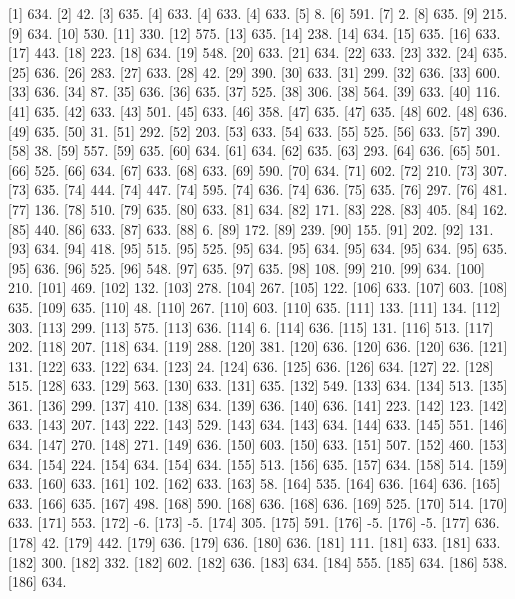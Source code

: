 [1] 634.
[2]  42.
[3] 635.
[4] 633.
[4] 633.
[4] 633.
[5]   8.
[6] 591.
[7]   2.
[8] 635.
[9] 215.
[9] 634.
[10] 530.
[11] 330.
[12] 575.
[13] 635.
[14] 238.
[14] 634.
[15] 635.
[16] 633.
[17] 443.
[18] 223.
[18] 634.
[19] 548.
[20] 633.
[21] 634.
[22] 633.
[23] 332.
[24] 635.
[25] 636.
[26] 283.
[27] 633.
[28]  42.
[29] 390.
[30] 633.
[31] 299.
[32] 636.
[33] 600.
[33] 636.
[34]  87.
[35] 636.
[36] 635.
[37] 525.
[38] 306.
[38] 564.
[39] 633.
[40] 116.
[41] 635.
[42] 633.
[43] 501.
[45] 633.
[46] 358.
[47] 635.
[47] 635.
[48] 602.
[48] 636.
[49] 635.
[50]  31.
[51] 292.
[52] 203.
[53] 633.
[54] 633.
[55] 525.
[56] 633.
[57] 390.
[58]  38.
[59] 557.
[59] 635.
[60] 634.
[61] 634.
[62] 635.
[63] 293.
[64] 636.
[65] 501.
[66] 525.
[66] 634.
[67] 633.
[68] 633.
[69] 590.
[70] 634.
[71] 602.
[72] 210.
[73] 307.
[73] 635.
[74] 444.
[74] 447.
[74] 595.
[74] 636.
[74] 636.
[75] 635.
[76] 297.
[76] 481.
[77] 136.
[78] 510.
[79] 635.
[80] 633.
[81] 634.
[82] 171.
[83] 228.
[83] 405.
[84] 162.
[85] 440.
[86] 633.
[87] 633.
[88]   6.
[89] 172.
[89] 239.
[90] 155.
[91] 202.
[92] 131.
[93] 634.
[94] 418.
[95] 515.
[95] 525.
[95] 634.
[95] 634.
[95] 634.
[95] 634.
[95] 635.
[95] 636.
[96] 525.
[96] 548.
[97] 635.
[97] 635.
[98] 108.
[99] 210.
[99] 634.
[100] 210.
[101] 469.
[102] 132.
[103] 278.
[104] 267.
[105] 122.
[106] 633.
[107] 603.
[108] 635.
[109] 635.
[110]  48.
[110] 267.
[110] 603.
[110] 635.
[111] 133.
[111] 134.
[112] 303.
[113] 299.
[113] 575.
[113] 636.
[114]   6.
[114] 636.
[115] 131.
[116] 513.
[117] 202.
[118] 207.
[118] 634.
[119] 288.
[120] 381.
[120] 636.
[120] 636.
[120] 636.
[121] 131.
[122] 633.
[122] 634.
[123]  24.
[124] 636.
[125] 636.
[126] 634.
[127]  22.
[128] 515.
[128] 633.
[129] 563.
[130] 633.
[131] 635.
[132] 549.
[133] 634.
[134] 513.
[135] 361.
[136] 299.
[137] 410.
[138] 634.
[139] 636.
[140] 636.
[141] 223.
[142] 123.
[142] 633.
[143] 207.
[143] 222.
[143] 529.
[143] 634.
[143] 634.
[144] 633.
[145] 551.
[146] 634.
[147] 270.
[148] 271.
[149] 636.
[150] 603.
[150] 633.
[151] 507.
[152] 460.
[153] 634.
[154] 224.
[154] 634.
[154] 634.
[155] 513.
[156] 635.
[157] 634.
[158] 514.
[159] 633.
[160] 633.
[161] 102.
[162] 633.
[163]  58.
[164] 535.
[164] 636.
[164] 636.
[165] 633.
[166] 635.
[167] 498.
[168] 590.
[168] 636.
[168] 636.
[169] 525.
[170] 514.
[170] 633.
[171] 553.
[172]  -6.
[173]  -5.
[174] 305.
[175] 591.
[176]  -5.
[176]  -5.
[177] 636.
[178]  42.
[179] 442.
[179] 636.
[179] 636.
[180] 636.
[181] 111.
[181] 633.
[181] 633.
[182] 300.
[182] 332.
[182] 602.
[182] 636.
[183] 634.
[184] 555.
[185] 634.
[186] 538.
[186] 634.
